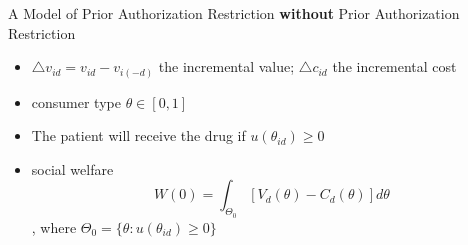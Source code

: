 \begin{frame}{A Model of Prior Authorization Restriction}
    \textbf{without} Prior Authorization Restriction
    \begin{itemize}
        \item $\triangle v_{id}=v_{id}-v_{i(-d)}$ the incremental value; $\triangle c_{id}$ the incremental cost
        \item consumer type $\theta \in [0,1]$
        \item The patient will receive the drug if $u(\theta_{id})\geq0$
        \item social welfare $$W(0)=\int_{\Theta_0} [V_d(\theta)-C_d(\theta)]d\theta $$, where  $\Theta_0 = \{\theta: u(\theta_{id}) \geq 0\}$
    \end{itemize}
\end{frame}